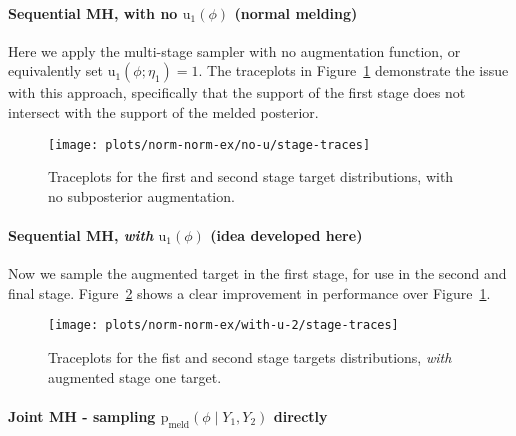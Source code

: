 \documentclass[10pt,a4paper,]{article}
\let\oldparagraph\paragraph
\renewcommand{\paragraph}[1]{\oldparagraph{#1}\mbox{}}
\newcommand{\pd}{\text{p}}
\newcommand{\pmeld}{\pd_{\text{meld}}}
\newcommand{\tarw}{\text{u}}
\begin{document}
\paragraph{\texorpdfstring{Sequential MH, with no \(\text{u}_{1}(\phi)\)
(normal
melding)}{Sequential MH, with no \textbackslash{}text\{u\}\_\{1\}(\textbackslash{}phi) (normal melding)}}\label{sequential-mh-with-no-textu_1phi-normal-melding}

Here we apply the multi-stage sampler with no augmentation function, or
equivalently set \(\tarw_{1}(\phi; \eta_{1}) = 1\). The traceplots in
Figure~\ref{fig:no_u_traces} demonstrate the issue with this approach,
specifically that the support of the first stage does not intersect with
the support of the melded posterior.

\begin{figure}

{\centering \texttt{[image: plots/norm-norm-ex/no-u/stage-traces]} 

}

\caption{Traceplots for the first and second stage target distributions, with no subposterior augmentation.}\label{fig:no_u_traces}
\end{figure}

\paragraph{\texorpdfstring{Sequential MH, \emph{with}
\(\text{u}_{1}(\phi)\) (idea developed
here)}{Sequential MH, with \textbackslash{}text\{u\}\_\{1\}(\textbackslash{}phi) (idea developed here)}}\label{sequential-mh-with-textu_1phi-idea-developed-here}

Now we sample the augmented target in the first stage, for use in the
second and final stage. Figure~\ref{fig:with_u_traces_2} shows a clear
improvement in performance over Figure~\ref{fig:no_u_traces}.

\begin{figure}

{\centering \texttt{[image: plots/norm-norm-ex/with-u-2/stage-traces]} 

}

\caption{Traceplots for the fist and second stage targets distributions, \textit{with} augmented stage one target.}\label{fig:with_u_traces_2}
\end{figure}

\paragraph{\texorpdfstring{Joint MH - sampling
\(\pmeld(\phi \mid Y_{1}, Y_{2})\)
directly}{Joint MH - sampling \textbackslash{}pmeld(\textbackslash{}phi \textbackslash{}mid Y\_\{1\}, Y\_\{2\}) directly}}\label{joint-mh---sampling-pmeldphi-mid-y_1-y_2-directly}
\end{document}
